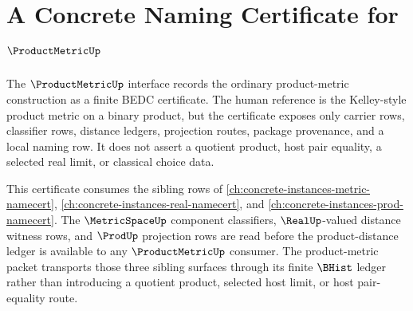 \chapter{A Concrete Naming Certificate for $\ProductMetricUp$}
\label{ch:concrete-instances-productmetric-namecert}

The $\ProductMetricUp$ interface records the ordinary product-metric construction as a finite BEDC certificate. The human reference is the Kelley-style product metric on a binary product, but the certificate exposes only carrier rows, classifier rows, distance ledgers, projection routes, package provenance, and a local naming row. It does not assert a quotient product, host pair equality, a selected real limit, or classical choice data.

This certificate consumes the sibling rows of \autoref{ch:concrete-instances-metric-namecert}, \autoref{ch:concrete-instances-real-namecert}, and \autoref{ch:concrete-instances-prod-namecert}. The $\MetricSpaceUp$ component classifiers, $\RealUp$-valued distance witness rows, and $\ProdUp$ projection rows are read before the product-distance ledger is available to any $\ProductMetricUp$ consumer. The product-metric packet transports those three sibling surfaces through its finite $\BHist$ ledger rather than introducing a quotient product, selected host limit, or host pair-equality route.

